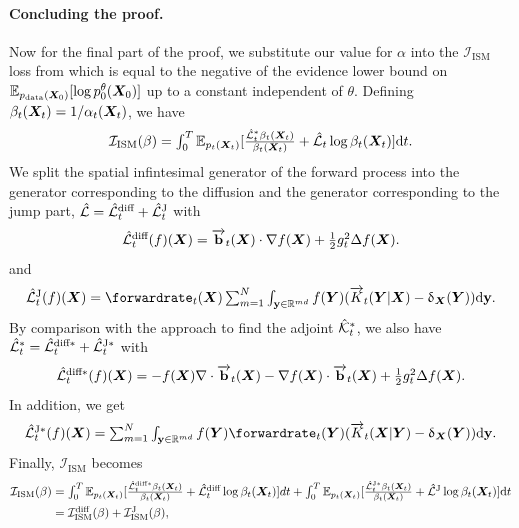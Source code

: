\paragraph{Concluding the proof.} Now for the final part of the proof, we
substitute our value for $\alpha$ into the $\mathcal{I}_{\text{ISM}}$ loss from
\cite{benton2022denoising} which is equal to the negative of the evidence lower
bound on $\mathbb{E}_{p_{\rm{data}}({\bm{X}}_0)} [ \log p_0^\theta({\bm{X}}_0) ]$ up to
a constant independent of $\theta$. Defining
$\beta_t({\bm{X}}_t) = 1 / \alpha_t({\bm{X}}_t)$, we have
\begin{equation}
  \textstyle 
    \mathcal{I}_{\text{ISM}} (\beta) = \int_{0}^T \mathbb{E}_{p_t({\bm{X}}_t)} [ \frac{\hat{\mathcal{L}}_t^* \beta_t({\bm{X}}_t)}{\beta_t({\bm{X}}_t)} + \hat{\mathcal{L}}_t \log \beta_t({\bm{X}}_t) ] \mathrm{d} t . 
\end{equation}
 We split the spatial infintesimal generator of the forward process into the generator corresponding to the diffusion and the generator corresponding to the jump part, $\hat{\mathcal{L}} = \hat{\mathcal{L}}^{\text{diff}}_t + \hat{\mathcal{L}}^{\text{J}}_t$ with
 \begin{equation}
    \textstyle  \hat{\mathcal{L}}^{\text{diff}}_t(f)({\bm{X}}) = \overrightarrow{\mathbf{b}}_t({\bm{X}}) \cdot \nabla f({\bm{X}}) + \frac{1}{2} g_t^2 \Delta f({\bm{X}}) . 
 \end{equation}
 and 
 \begin{equation}
   \textstyle \LJ_t(f)(\mX) = \forwardrate_t(\mX) \inty f(\mY) ( \ftk_t(\mY | \mX) - \updelta_{\mX}(\mY) ) \rmd \y . 
 \end{equation}
 By comparison with the approach to find the adjoint $\hat{\mathcal{K}}^*_t$, we also have
 $\hat{\mathcal{L}}_t^* = \hat{\mathcal{L}}_t^{\text{diff}*} + \hat{\mathcal{L}}^{\text{J}* }_t$ with
 \begin{equation}
\textstyle     \hat{\mathcal{L}}_t^{\text{diff}*}(f)({\bm{X}}) = -f({\bm{X}}) \nabla \cdot \overrightarrow{\mathbf{b}}_t({\bm{X}}) - \nabla f({\bm{X}}) \cdot \overrightarrow{\mathbf{b}}_t({\bm{X}}) + \frac{1}{2} g_t^2 \Delta f({\bm{X}}) .
   \end{equation}
In addition, we get 
 \begin{equation}
     \textstyle \aLJ_t(f)(\mX) = \inty f(\mY) \forwardrate_t(\mY) ( \ftk_t(\mX | \mY) - \updelta_{\mX}(\mY) ) \rmd \y .
 \end{equation}
Finally, $\mathcal{I}_{\text{ISM}}$ becomes
\begin{align}
    \mathcal{I}_{\text{ISM}} (\beta) &\textstyle = \int_{0}^T \mathbb{E}_{p_t({\bm{X}}_t)} [ \frac{\hat{\mathcal{L}}_t^{\text{diff}*} \beta_t({\bm{X}}_t)}{\beta_t({\bm{X}}_t)} + \hat{\mathcal{L}}^{\text{diff}}_t \log \beta_t({\bm{X}}_t) ] dt + 
    \int_{0}^T \mathbb{E}_{p_t({\bm{X}}_t)} [ \frac{\hat{\mathcal{L}}^{\text{J}* }_t \beta_t({\bm{X}}_t)}{\beta_t({\bm{X}}_t)} + \hat{\mathcal{L}}^{\text{J}} \log \beta_t({\bm{X}}_t) ] \mathrm{d} t \\
    &\textstyle = \mathcal{I}_{\text{ISM}}^{\text{diff}}(\beta) + \mathcal{I}_{\text{ISM}}^{\text{J}}(\beta) , 
\end{align}

